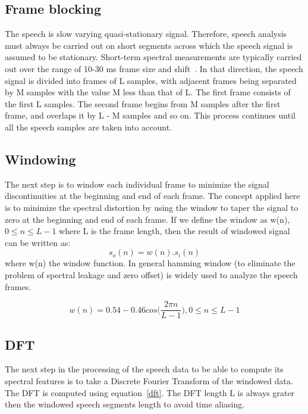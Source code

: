 \begin{spacing}{1.5}
\subsection{Frame blocking} The speech is slow varying quasi-stationary signal.
Therefore, speech analysis must always be carried out on short segments across which the speech signal is assumed to be stationary. Short-term spectral measurements are typically carried out over the range of 10-30 ms frame size and shift~\cite{beigi2011speaker}. In that direction, the speech signal is divided into frames of L samples, with adjacent frames being separated by M samples with the value M less than that of L. The first frame consists of the first L samples. The second frame begins from M samples after the first frame, and overlaps it by L - M samples and so on. This process continues until all the speech samples are taken into account.

\subsection{Windowing} The next step is to window each individual frame to minimize the signal discontinuities at the beginning and end of each frame. The concept applied here is to minimize the spectral distortion by using the window to taper the signal to zero at the beginning and end of each frame. If we define the window as w(n), $0 \leq n \leq L-1$  where L is the frame length, then the result of windowed signal can be written as:
\begin{equation}
 s_{o}(n)=w(n).s_{i}(n)
\end{equation} 
where w(n) the window function. In general hamming window (to eliminate the problem of spectral leakage and zero offset) is widely used to analyze the speech frames.


\begin{equation}
 w(n)=0.54-0.46cos\Bigg(\frac{2\pi n}{L-1}\Bigg), 0\leq n \leq L-1
\end{equation} 


\subsection{DFT} The next step in the processing of the speech data to be able to compute its spectral features is to take a Discrete Fourier Transform of the windowed data. The DFT is computed using equation~\ref{dft}. The DFT length L is always grater then the windowed speech segments length to avoid time aliasing.


\end{spacing}

